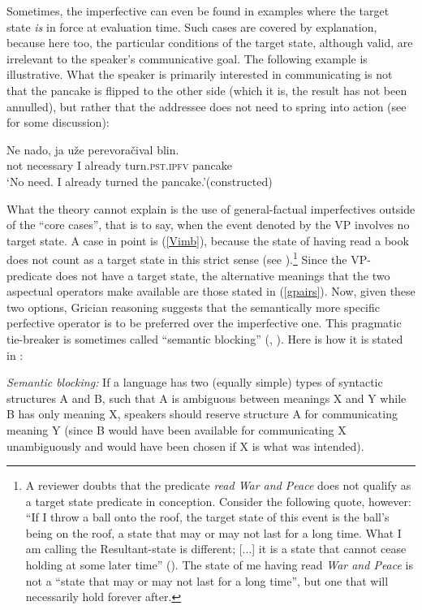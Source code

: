 \documentclass[output=paper,colorlinks,citecolor=brown]{langscibook}
\begin{document}
\noindent Sometimes, the imperfective can even be found in examples where the target state \textit{is} in force at evaluation time.
Such cases are covered by  explanation, because here too, the particular conditions of the target state, although valid, are irrelevant to the speaker's communicative goal.
The following example is illustrative. What the speaker is primarily interested in communicating is not that the pancake is flipped to the other side (which it is, the result has not been annulled), but rather that the addressee does not need to spring into action (see \citealt[289]{muellerhab} for some discussion): 

\ea\label{blin}
\gll Ne nado, ja uže perevoračival blin. \\
not necessary I already turn.\textsc{pst.ipfv} 
pancake \\
\glt `No need. I already turned the pancake.'\hfill(constructed)
\z

\noindent What the theory cannot explain is the use of general-factual imperfectives outside of the ``core cases'', that is to say, when the event denoted by the VP involves no target state. 
A case in point is (\ref{Vimb}), because the state of having read a book does not count as a target state in this strict sense (see \citealt[232]{Gronn2004}).\footnote{A reviewer doubts that the predicate \textit{read \textit{War and Peace}} does not qualify as a target state predicate in  conception. Consider the following quote, however: ``If I throw a ball
onto the roof, the target state of this event is the
ball's being on the roof, a state that may or may not
last for a long time. What I am calling the
Resultant-state is different; [...] it is a
state that cannot cease holding at some later time'' (\citealt[235]{Parsons1990}). The state of me having read \textit{War and Peace} is not a ``state that may or may not
last for a long time'', but one that will necessarily hold forever after.} Since the VP-predicate does not have a target state, the alternative meanings that the two aspectual operators make available are those stated in (\ref{gpairs}). Now, given these two options, Grician reasoning suggests that the semantically more specific perfective operator is to be preferred over the imperfective one. This pragmatic tie-breaker is sometimes called ``semantic blocking'' (\citealt{Kiparsky05}, \citealt{Deo2012}). 
Here is how it is stated in \citet[32]{Dowty1980}: 

\eanoraggedright\label{semblock}
\textit{Semantic blocking:} If a language has two (equally simple) types of syntactic structures A and B, such that A is
ambiguous between meanings X and Y while B has only meaning X, speakers should reserve
structure A for communicating meaning Y (since B would have been available for communicating X unambiguously and would have been chosen if X is what was intended).
\z
\end{document}
